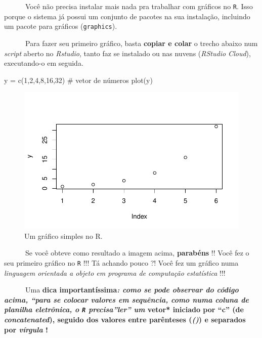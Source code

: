 \documentclass[
  letterpaper,
  DIV=11,
  numbers=noendperiod]{scrreprt}
\newenvironment{Shaded}{\begin{snugshade}}{\end{snugshade}}
\newcommand{\CommentTok}[1]{\textcolor[rgb]{0.37,0.37,0.37}{#1}}
\newcommand{\DecValTok}[1]{\textcolor[rgb]{0.68,0.00,0.00}{#1}}
\newcommand{\FunctionTok}[1]{\textcolor[rgb]{0.28,0.35,0.67}{#1}}
\newcommand{\NormalTok}[1]{\textcolor[rgb]{0.00,0.23,0.31}{#1}}
\newcommand{\OtherTok}[1]{\textcolor[rgb]{0.00,0.23,0.31}{#1}}
\begin{document}
~~~~~~Você não precisa instalar mais nada pra trabalhar com gráficos no
\texttt{R}. Isso porque o sistema já possui um conjunto de pacotes na
sua instalação, incluindo um pacote para gráficos (\texttt{graphics}).

~~~~~~Para fazer seu primeiro gráfico, basta \textbf{copiar e colar} o
trecho abaixo num \emph{script} aberto no \emph{Rstudio}, tanto faz se
instalado ou nas nuvens (\emph{RStudio Cloud}), executando-o em seguida.

\begin{Shaded}
\begin{Highlighting}[]
\NormalTok{y }\OtherTok{=} \FunctionTok{c}\NormalTok{(}\DecValTok{1}\NormalTok{,}\DecValTok{2}\NormalTok{,}\DecValTok{4}\NormalTok{,}\DecValTok{8}\NormalTok{,}\DecValTok{16}\NormalTok{,}\DecValTok{32}\NormalTok{)  }\CommentTok{\# vetor de números}
\FunctionTok{plot}\NormalTok{(y)}
\end{Highlighting}
\end{Shaded}

\begin{figure}[H]

{\centering \includegraphics{basico_files/figure-pdf/unnamed-chunk-2-1.pdf}

}

\caption{Um gráfico simples no R.}

\end{figure}%

~~~~~~Se você obteve como resultado a imagem acima, \textbf{parabéns} !!
Você fez o seu primeiro gráfico no \texttt{R} !!! Tá achando pouco ?!
Você fez um gráfico numa \emph{linguagem orientada a objeto em programa
de computação estatística} !!!

~~~~~~Uma \textbf{dica importantíssima\emph{: como se pode observar do
código acima, ``para se colocar valores em sequência, como numa coluna
de planilha eletrônica, o \texttt{R} precisa''ler'' um }vetor* iniciado
por ``c'' (de \emph{concatenated}), seguido dos valores entre parênteses
(\emph{()}) e separados por \emph{vírgula} !}
\end{document}

